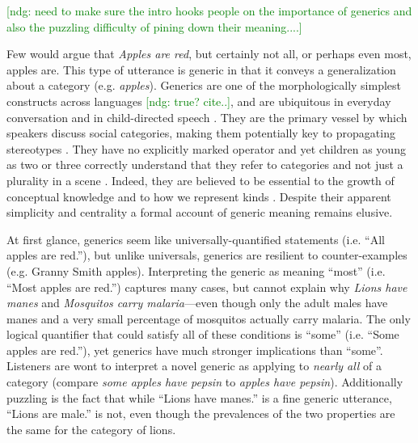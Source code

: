 \documentclass[10pt,letterpaper]{article}
\newcommand{\ndg}[1]{\textcolor{Green}{[ndg: #1]}}
\begin{document}
\ndg{need to make sure the intro hooks people on the importance of generics and also the puzzling difficulty of pining down their meaning....}


Few would argue that \emph{Apples are red}, but certainly not all, or perhaps even most, apples are.
This type of utterance is generic \cite{Carlson1977, Leslie2008} in that it conveys a generalization about a category (e.g. \emph{apples}).  
Generics are one of the morphologically simplest constructs across languages \ndg{true? cite..}, and are ubiquitous in everyday conversation and in child-directed speech \cite{Gelman2008}.
They are the primary vessel by which speakers discuss social categories, making them potentially key to propagating stereotypes \cite{GelmanEtAl2004, Cimpian2010motivation, Leslie2015}.
They have no explicitly marked operator and yet children as young as two or three correctly understand that they refer to categories and not just a plurality in a scene \cite{Cimpian2008}. 
Indeed, they are believed to be essential to the growth of conceptual knowledge \cite{Gelman2004} and to how we represent kinds \cite{Leslie2008}.
Despite their apparent simplicity and centrality a formal account of generic meaning remains elusive.

At first glance, generics seem like universally-quantified statements (i.e. ``All apples are red.''), but unlike universals, generics are resilient to counter-examples (e.g. Granny Smith apples). 
Interpreting the generic as meaning ``most'' (i.e. ``Most apples are red.'') captures many cases, but cannot explain why \emph{Lions have manes} and \emph{Mosquitos carry malaria}---even though only the adult males have manes and a very small percentage of mosquitos actually carry malaria.
The only logical quantifier that could satisfy all of these conditions is ``some'' (i.e. ``Some apples are red.''), yet generics have much stronger implications than ``some''. 
Listeners are wont to interpret a novel generic as applying to \emph{nearly all} of a category \cite{Gelman2002, Cimpian2010} (compare \emph{some apples have pepsin} to \emph{apples have pepsin}).
Additionally puzzling is the fact that while ``Lions have manes.'' is a fine generic utterance, ``Lions are male.'' is not, even though the prevalences of the two properties are the same for the category of lions.
\end{document}
